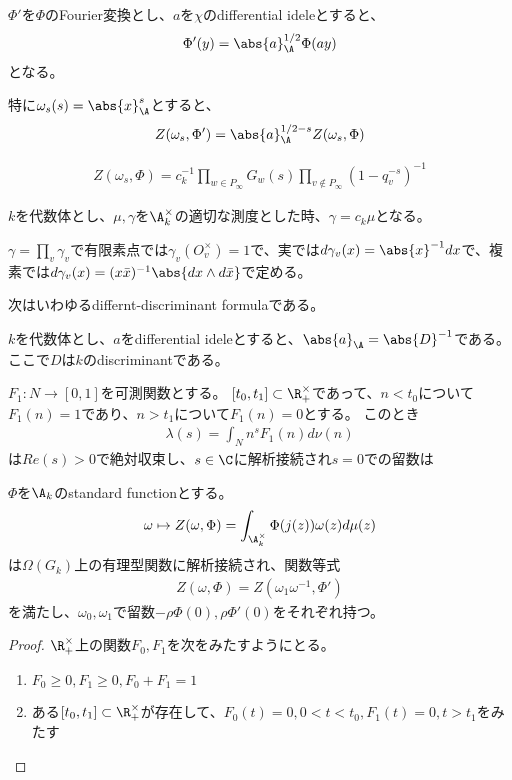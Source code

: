 \documentclass[uplatex, a4paper]{jsbook}
\begin{document}
$\Phi'$を$\Phi$のFourier変換とし、$a$を$\chi$のdifferential ideleとすると、
\begin{align*}
\Phi'(y)=\abs{a}^{1/2}_{\A}\Phi(ay)
\end{align*}
となる。

特に$\omega_s(s)=\abs{x}^s_{\A}$とすると、
\begin{align}
Z(\omega_s, \Phi')=\abs{a}^{1/2-s}_{\A}Z(\omega_s,\Phi)
\end{align}

\begin{align}
Z(\omega_s,\Phi)=c_k^{-1}\prod_{w\in P_\infty}G_w(s)\prod_{v\notin P_\infty}(1-q_v^{-s})^{-1}
\end{align}

\begin{prop}[Proposition 12, p.128]
$k$を代数体とし、$\mu, \gamma$を$\A_k^\times$の適切な測度とした時、$\gamma=c_k\mu$となる。

$\gamma=\prod_v\gamma_v$で有限素点では$\gamma_v(O_v^\times)=1$で、実では$d\gamma_v(x)=\abs{x}^{-1}dx$で、複素では$d\gamma_v(x)=(x\bar{x})^{-1}\abs{dx\wedge d\bar{x}}$で定める。
\end{prop}

次はいわゆるdiffernt-discriminant formulaである。
\begin{prop}[Proposition 6, p.113]
$k$を代数体とし、$a$をdifferential ideleとすると、$\abs{a}_{\A}=\abs{D}^{-1}$である。ここで$D$は$k$のdiscriminantである。
\end{prop}

\begin{lem}[Lemma 6, p.121]
$F_1:N \to [0,1]$を可測関数とする。
$[t_0,t_1] \subset \R_+^\times$であって、$n<t_0$について$F_1(n)=1$であり、$n>t_1$について$F_1(n)=0$とする。
このとき
\begin{align*}
\lambda(s)=\int_Nn^sF_1(n)d\nu(n)
\end{align*}
は$Re(s)>0$で絶対収束し、$s\in\C$に解析接続され$s=0$での留数は
\end{lem}

\begin{thm}[Theorem 2, p.121]
$\Phi$を$\A_k$のstandard functionとする。
\begin{align*}
\omega \mapsto Z(\omega, \Phi)=\int_{\A_k^\times}\Phi(j(z))\omega(z)d\mu(z)
\end{align*}
は$\Omega(G_k)$上の有理型関数に解析接続され、関数等式
\begin{align*}
Z(\omega,\Phi)=Z(\omega_1\omega^{-1},\Phi')
\end{align*}
を満たし、$\omega_0, \omega_1$で留数$-\rho\Phi(0), \rho\Phi'(0)$をそれぞれ持つ。
\end{thm}
\begin{proof}
$\R^\times_+$上の関数$F_0, F_1$を次をみたすようにとる。
\begin{enumerate}
\item $F_0\geq0, F_1\geq0, F_0+F_1=1$
\item ある$[t_0,t_1] \subset \R^\times_+$が存在して、$F_0(t)=0, 0<t<t_0, F_1(t)=0, t>t_1$をみたす
\end{enumerate}
\end{proof}
\end{document}
